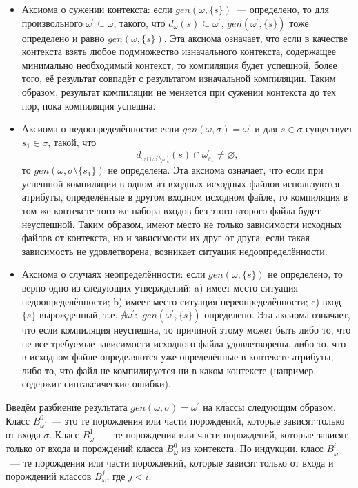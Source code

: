 \begin{itemize}
	\item Аксиома о сужении контекста: если $gen(\omega,\{s\})$~--- определено, то для произвольного $\omega^\prime\subseteq\omega$, такого, что $d_\omega(s)\subseteq\omega^\prime$, $gen(\omega^\prime, \{s\})$ тоже определено и равно $gen(\omega,\{s\})$. Эта аксиома означает, что если в качестве контекста взять любое подмножество изначального контекста, содержащее минимально необходимый контекст, то компиляция будет успешной, более того, её результат совпадёт с результатом изначальной компиляции. Таким образом, результат компиляции не меняется при сужении контекста до тех пор, пока компиляция успешна.
	
	\item Аксиома о недоопределённости: если $gen(\omega, \sigma) = \omega^\prime$ и для $s \in \sigma$ существует $s_1 \in \sigma$, такой, что $$d_{\omega \cup \omega^\prime \setminus \omega^\prime_s}(s) \cap \omega^\prime_{s_1} \neq \varnothing,$$ то $gen(\omega, \sigma \setminus \{s_1\})$ не определена. Эта аксиома означает, что если при успешной компиляции в одном из входных исходных файлов используются атрибуты, определённые в другом входном исходном файле, то компиляция в том же контексте того же набора входов без этого второго файла будет неуспешной. Таким образом, имеют место не только зависимости исходных файлов от контекста, но и зависимости их друг от друга; если такая зависимость не удовлетворена, возникает ситуация недоопределённости.
	
	\item Аксиома о случаях неопределённости: если $gen(\omega, \{s\})$ не определено, то верно одно из следующих утверждений: a) имеет место ситуация недоопределённости; b) имеет место ситуация переопределённости; c) вход $\{s\}$ вырожденный, т.е. $\nexists \omega^\prime:$ $gen(\omega^\prime, \{s\})$ определено. Эта аксиома означает, что если компиляция неуспешна, то причиной этому может быть либо то, что не все требуемые зависимости исходного файла удовлетворены, либо то, что в исходном файле определяются уже определённые в контексте атрибуты, либо то, что файл не компилируется ни в каком контексте (например, содержит синтаксические ошибки).
\end{itemize}

Введём разбиение результата $gen(\omega, \sigma) = \omega^\prime$ на классы следующим образом. Класс $B^0_{\omega^\prime}$~--- это те порождения или части порождений, которые зависят только от входа $\sigma$. Класс $B^1_{\omega^\prime}$~--- те порождения или части порождений, которые зависят только от входа и порождений класса $B^0_{\omega}$ из контекста. По индукции, класс $B^i_{\omega^\prime}$~--- те порождения или части порождений, которые зависят только от входа и порождений классов $B^j_{\omega}$, где $j < i$.

